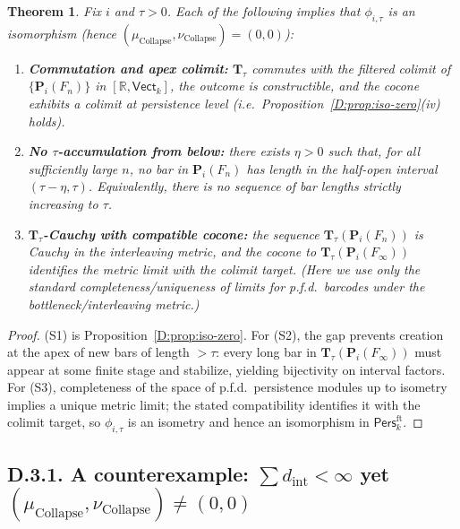 \documentclass[11pt]{article}
\newcommand{\Pers}{\mathsf{Pers}}
\numberwithin{equation}{section}
\newtheorem{theorem}{Theorem}[section]
\theoremstyle{definition}
\DeclareRobustCommand{\muc}{\mu_{\mathrm{Collapse}}}
\DeclareRobustCommand{\nuc}{\nu_{\mathrm{Collapse}}}
\begin{document}
\begin{theorem}\label{D:thm:sufficient}
Fix \(i\) and \(\tau>0\).
Each of the following implies that \(\phi_{i,\tau}\) is an isomorphism (hence \((\muc,\nuc)=(0,0)\)):
\begin{enumerate}
\item[(S1)] \textbf{Commutation and apex colimit:} \(\mathbf{T}_\tau\) commutes with the filtered colimit of \(\{\mathbf{P}_i(F_n)\}\) in \([\mathbb{R},\mathsf{Vect}_k]\), the outcome is constructible, and the cocone exhibits a colimit at persistence level (i.e.\ Proposition~\ref{D:prop:iso-zero}(iv) holds).
\item[(S2)] \textbf{No \(\tau\)-accumulation from below:} there exists \(\eta>0\) such that, for all sufficiently large \(n\), no bar in \(\mathbf{P}_i(F_n)\) has length in the half-open interval \((\tau-\eta,\tau)\).
Equivalently, there is no sequence of bar lengths strictly increasing to \(\tau\).
\item[(S3)] \textbf{\(\mathbf{T}_\tau\)-Cauchy with compatible cocone:} the sequence \(\mathbf{T}_\tau(\mathbf{P}_i(F_n))\) is Cauchy in the interleaving metric, and the cocone to \(\mathbf{T}_\tau(\mathbf{P}_i(F_\infty))\) identifies the metric limit with the colimit target.
(Here we use only the standard completeness/uniqueness of limits for p.f.d.\ barcodes under the bottleneck/interleaving metric.)
\end{enumerate}
\end{theorem}

\begin{proof}
(S1) is Proposition~\ref{D:prop:iso-zero}.
For (S2), the gap prevents creation at the apex of new bars of length \(>\tau\):
every long bar in \(\mathbf{T}_\tau(\mathbf{P}_i(F_\infty))\) must appear at some finite stage and stabilize, yielding bijectivity on interval factors.
For (S3), completeness of the space of p.f.d.\ persistence modules up to isometry implies a unique metric limit; the stated compatibility identifies it with the colimit target, so \(\phi_{i,\tau}\) is an isometry and hence an isomorphism in \(\Pers^{\mathrm{ft}}_k\).
\end{proof}

\subsection*{D.3.1. A counterexample: $\sum d_{\mathrm{int}}<\infty$ yet $(\muc,\nuc)\neq(0,0)$}
\end{document}
